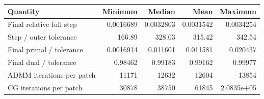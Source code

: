 \begin{tabular}{lrrrr}\toprule Quantity & Minimum & Median & Mean & Maximum\\\midrule
Final relative full step & 0.0016689 & 0.0032803 & 0.0031542 & 0.0034254 \\
Step / outer tolerance & 166.89 & 328.03 & 315.42 & 342.54 \\
Final primal / tolerance & 0.0016914 & 0.011601 & 0.011581 & 0.020437 \\
Final dual / tolerance & 0.98462 & 0.99183 & 0.99162 & 0.99977 \\
ADMM iterations per patch & 11171 & 12632 & 12604 & 13854 \\
CG iterations per patch & 30878 & 38750 & 61845 & 2.0835e+05 \\
\bottomrule\end{tabular}